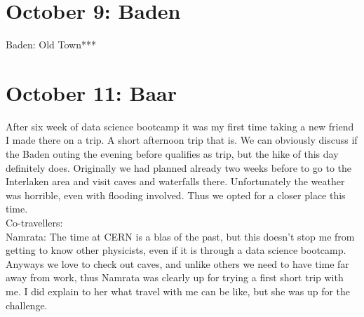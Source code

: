 \section{October 9: Baden}
\label{2020:Baden}

Baden: Old Town***

\section{October 11: Baar}
\label{2020Baar}

After six week of data science bootcamp it was my first time taking a new friend I made there on a trip. A short afternoon trip that is. We can obviously discuss if the Baden outing the evening before qualifies as trip, but the hike of this day definitely does. Originally we had planned already two weeks before to go to the Interlaken area and visit caves and waterfalls there. Unfortunately the weather was horrible, even with flooding involved. Thus we opted for a closer place this time.\\

Co-travellers:\\
Namrata: The time at CERN is a blas of the past, but this doesn't stop me from getting to know other physicists, even if it is through a data science bootcamp. Anyways we love to check out caves, and unlike others we need to have time far away from work, thus Namrata was clearly up for trying a first short trip with me. I did explain to her what travel with me can be like, but she was up for the challenge.\\

